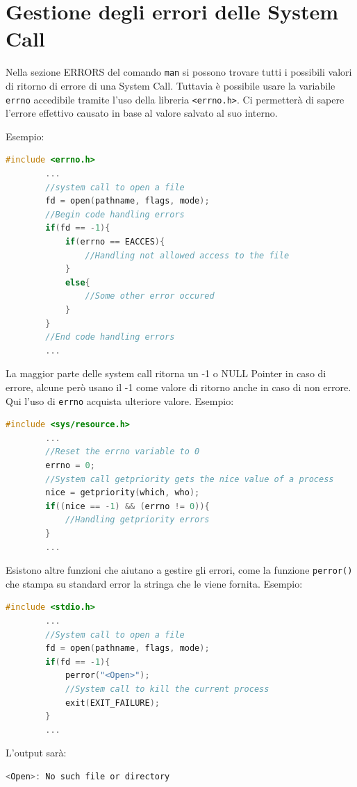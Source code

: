\documentclass[a4paper, 12pt]{book}
\begin{document}
    \section{Gestione degli errori delle System Call}

    Nella sezione ERRORS del comando \verb|man| si possono trovare
    tutti i possibili valori di ritorno di errore di una 
    System Call. Tuttavia è possibile usare la variabile 
    \verb|errno| accedibile tramite l'uso della libreria
    \verb|<errno.h>|. Ci permetterà di sapere l'errore 
    effettivo causato in base al valore salvato al suo 
    interno.

    Esempio:
    \begin{lstlisting}[language=C]
        #include <errno.h>
        ...
        //system call to open a file
        fd = open(pathname, flags, mode);
        //Begin code handling errors
        if(fd == -1){
            if(errno == EACCES){
                //Handling not allowed access to the file
            }
            else{
                //Some other error occured
            }
        }
        //End code handling errors
        ...
    \end{lstlisting}
    La maggior parte delle system call ritorna un -1 
    o NULL Pointer in caso di errore, alcune però 
    usano il -1 come valore di ritorno anche in caso di 
    non errore. Qui l'uso di \verb|errno| acquista 
    ulteriore valore. Esempio:
    \begin{lstlisting}[language=C]
        #include <sys/resource.h>
        ... 
        //Reset the errno variable to 0
        errno = 0;
        //System call getpriority gets the nice value of a process 
        nice = getpriority(which, who);
        if((nice == -1) && (errno != 0)){
            //Handling getpriority errors
        }
        ...        
    \end{lstlisting}
    
    Esistono altre funzioni che aiutano a gestire gli 
    errori, come la funzione \verb|perror()| che stampa 
    su standard error la stringa che le viene fornita.
    Esempio:
    \begin{lstlisting}[language=C]
        #include <stdio.h>
        ... 
        //System call to open a file
        fd = open(pathname, flags, mode);
        if(fd == -1){
            perror("<Open>");
            //System call to kill the current process
            exit(EXIT_FAILURE);
        }
        ...
    \end{lstlisting}
    L'output sarà:
    \begin{lstlisting}[language=C]
        <Open>: No such file or directory
    \end{lstlisting}
    
\end{document}
